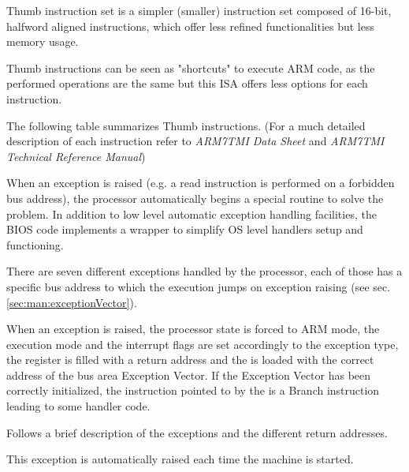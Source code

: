 
Thumb instruction set is a simpler (smaller) instruction set composed of 16-bit, halfword aligned instructions, which offer less refined functionalities but less memory usage.

Thumb instructions can be seen as "shortcuts" to execute ARM code, as the performed operations are the same but this ISA offers less options for each instruction.

The following table summarizes Thumb instructions. (For a much detailed description of each instruction refer to \emph{ARM7TMI Data Sheet} and \emph{ARM7TMI Technical Reference Manual})

\vspace{5px}
\begin{adjustbox}{center}

\end{adjustbox}
\vspace{5px}

\label{sec:man:exceptionHandling}

When an exception is raised (e.g. a read instruction is performed on a forbidden bus address), the processor automatically begins a special routine to solve the problem. 
In addition to low level automatic exception handling facilities, the BIOS code implements a wrapper to simplify OS level handlers setup and functioning.

\label{sec:man:hardwareExceptions}

There are seven different exceptions handled by the processor, each of those has a specific bus address to which the execution jumps on exception raising (see sec. \ref{sec:man:exceptionVector}).

When an exception is raised, the processor state is forced to ARM mode, the execution mode and the interrupt flags are set accordingly to the exception type, the  register is filled with a return address and the  is loaded with the correct address of the bus area Exception Vector. 
If the Exception Vector has been correctly initialized, the instruction pointed to by the  is a Branch instruction leading to some handler code.

Follows a brief description of the exceptions and the different return addresses.

This exception is automatically raised each time the machine is started. 

